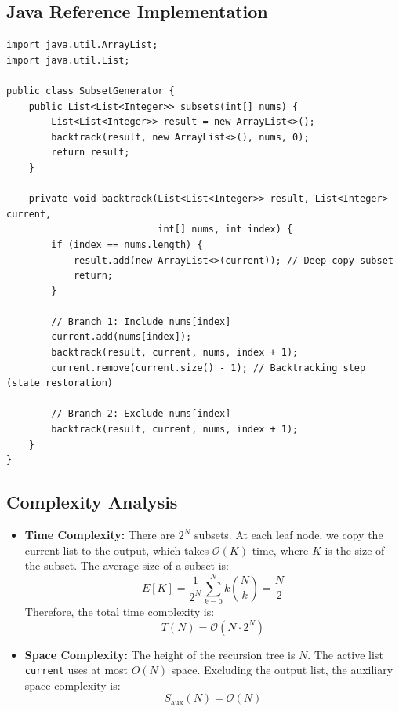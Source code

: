 \documentclass[10pt,journal,compsoc,onecolumn]{IEEEtran}
\begin{document}
\subsection{Java Reference Implementation}
\begin{verbatim}
import java.util.ArrayList;
import java.util.List;

public class SubsetGenerator {
    public List<List<Integer>> subsets(int[] nums) {
        List<List<Integer>> result = new ArrayList<>();
        backtrack(result, new ArrayList<>(), nums, 0);
        return result;
    }

    private void backtrack(List<List<Integer>> result, List<Integer> current, 
                           int[] nums, int index) {
        if (index == nums.length) {
            result.add(new ArrayList<>(current)); // Deep copy subset
            return;
        }

        // Branch 1: Include nums[index]
        current.add(nums[index]);
        backtrack(result, current, nums, index + 1);
        current.remove(current.size() - 1); // Backtracking step (state restoration)

        // Branch 2: Exclude nums[index]
        backtrack(result, current, nums, index + 1);
    }
}
\end{verbatim}

\subsection{Complexity Analysis}
\begin{itemize}
    \item \textbf{Time Complexity:} There are $2^N$ subsets. At each leaf node, we copy the current list to the output, which takes $\mathcal{O}(K)$ time, where $K$ is the size of the subset. The average size of a subset is:
    \begin{equation}
    E[K] = \frac{1}{2^N}\sum_{k=0}^{N} k \binom{N}{k} = \frac{N}{2}
    \end{equation}
    Therefore, the total time complexity is:
    \begin{equation}
    T(N) = \mathcal{O}(N \cdot 2^N)
    \end{equation}
    \item \textbf{Space Complexity:} The height of the recursion tree is $N$. The active list \texttt{current} uses at most $O(N)$ space. Excluding the output list, the auxiliary space complexity is:
    \begin{equation}
    S_{\text{aux}}(N) = \mathcal{O}(N)
    \end{equation}
\end{itemize}
\end{document}
